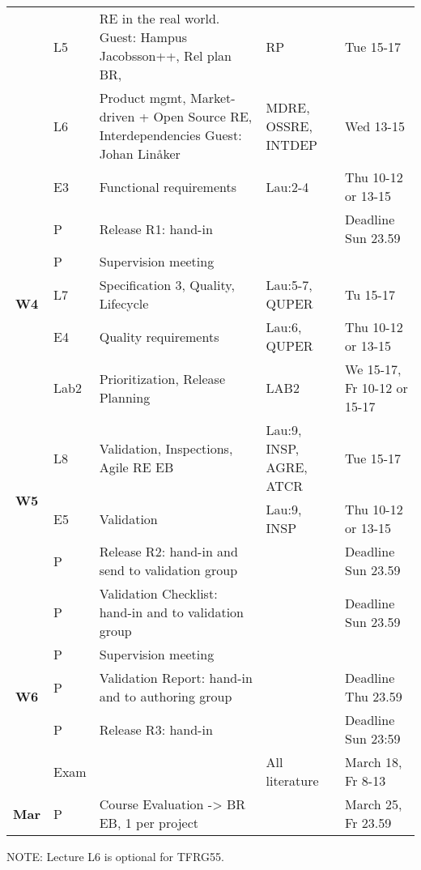 \begin{flushleft}
\begin{tabular}{c | p{0.5cm} p{4.4cm} p{2.2cm}  p{3.2cm}}
& L5 & RE in the real world. Guest: Hampus Jacobsson++, Rel plan BR, & RP & Tue 15-17 \\
& L6 & Product mgmt, Market-driven + Open Source RE, Interdependencies Guest: Johan Linåker & MDRE, OSSRE, INTDEP & Wed 13-15 \\
& E3 & Functional requirements  & Lau:2-4  & Thu 10-12 or 13-15\\
& P & Release R1: hand-in& & Deadline Sun 23.59 \\
\hline
\multirow{3}{*}{{\bfseries\sffamily W4}} 
& P & Supervision meeting & & \\
& L7 & Specification 3, Quality, Lifecycle & Lau:5-7, QUPER  & Tu 15-17\\
& E4 & Quality requirements &  Lau:6, QUPER  &Thu 10-12 or 13-15\\
& Lab2 & Prioritization, Release Planning & LAB2 &   We 15-17, Fr 10-12 or 15-17\\
\hline
\multirow{3}{*}{{\bfseries\sffamily W5}} 
& L8 & Validation, Inspections, \newline  Agile RE EB& 
Lau:9, INSP, AGRE, ATCR & Tue 15-17\\
& E5 & Validation & Lau:9, INSP  & Thu 10-12 or 13-15\\
& P & Release R2: hand-in and send to validation group & & Deadline Sun 23.59 \\
& P & Validation Checklist: hand-in and to validation group & & Deadline Sun 23.59\\
\hline
\multirow{3}{*}{{\bfseries\sffamily W6}} 
& P & Supervision meeting & & \\
& P &  Validation Report: hand-in and to authoring group & & Deadline Thu 23.59  \\
\hline
\multirow{1}{*}{{\bfseries\sffamily W7}} 
\CONF
& P & Release R3: hand-in & & Deadline Sun 23:59\\
\hline
\multirow{1}{*}{{\bfseries\sffamily  }} 
& Exam & &All literature  & March 18, Fr 8-13\\
\multirow{1}{*}{{\bfseries\sffamily Mar }}   
&  P & \multirow{1}{*}{Course Evaluation -> BR EB, 1 per project} & & March 25, Fr 23.59\\
\hline
\end{tabular} 
\end{flushleft}

\ifteknolog\else 
NOTE: Lecture L6 is optional for TFRG55.
\fi

